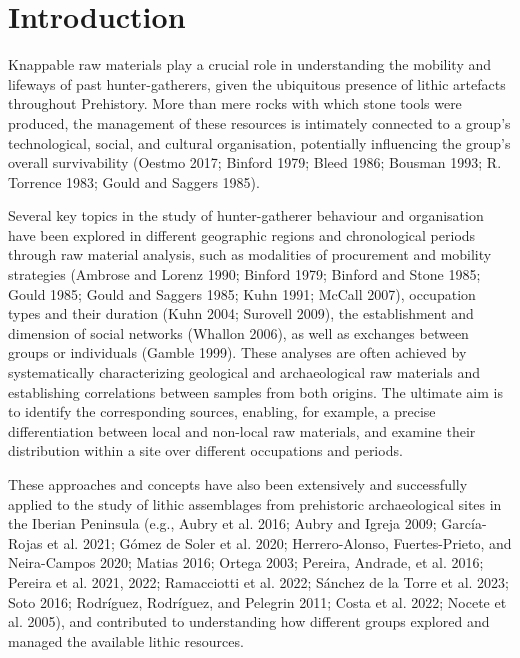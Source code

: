 \documentclass[
  a4paper,
  DIV=11,
  numbers=noendperiod]{scrreprt}
\begin{document}
\newpage

\section{Introduction}\label{introduction-2}

Knappable raw materials play a crucial role in understanding the
mobility and lifeways of past hunter-gatherers, given the ubiquitous
presence of lithic artefacts throughout Prehistory. More than mere rocks
with which stone tools were produced, the management of these resources
is intimately connected to a group's technological, social, and cultural
organisation, potentially influencing the group's overall survivability
(Oestmo 2017; Binford 1979; Bleed 1986; Bousman 1993; R. Torrence 1983;
Gould and Saggers 1985).

Several key topics in the study of hunter-gatherer behaviour and
organisation have been explored in different geographic regions and
chronological periods through raw material analysis, such as modalities
of procurement and mobility strategies (Ambrose and Lorenz 1990; Binford
1979; Binford and Stone 1985; Gould 1985; Gould and Saggers 1985; Kuhn
1991; McCall 2007), occupation types and their duration (Kuhn 2004;
Surovell 2009), the establishment and dimension of social networks
(Whallon 2006), as well as exchanges between groups or individuals
(Gamble 1999). These analyses are often achieved by systematically
characterizing geological and archaeological raw materials and
establishing correlations between samples from both origins. The
ultimate aim is to identify the corresponding sources, enabling, for
example, a precise differentiation between local and non-local raw
materials, and examine their distribution within a site over different
occupations and periods.

These approaches and concepts have also been extensively and
successfully applied to the study of lithic assemblages from prehistoric
archaeological sites in the Iberian Peninsula (e.g., Aubry et al. 2016;
Aubry and Igreja 2009; García-Rojas et al. 2021; Gómez de Soler et al.
2020; Herrero-Alonso, Fuertes-Prieto, and Neira-Campos 2020; Matias
2016; Ortega 2003; Pereira, Andrade, et al. 2016; Pereira et al. 2021,
2022; Ramacciotti et al. 2022; Sánchez de la Torre et al. 2023; Soto
2016; Rodríguez, Rodríguez, and Pelegrin 2011; Costa et al. 2022; Nocete
et al. 2005), and contributed to understanding how different groups
explored and managed the available lithic resources.
\end{document}
